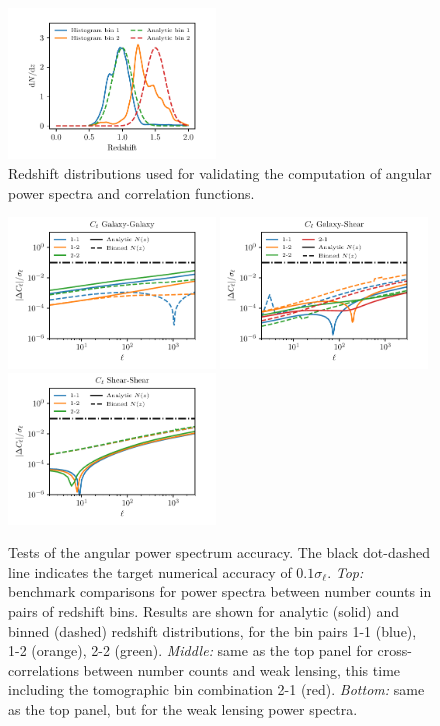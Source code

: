 \documentclass[\docopts]{\docclass}
\begin{document}
\begin{figure}
\centering
\includegraphics[width=0.49\textwidth]{dNdz_codecomp}
\caption{Redshift distributions used for validating the computation of angular power spectra and correlation functions.}
\label{fig:zhistos}
\end{figure}
\begin{figure}
\includegraphics[width=0.49\textwidth]{Cl_dd}
\includegraphics[width=0.49\textwidth]{Cl_dl}
\includegraphics[width=0.49\textwidth]{Cl_ll}
\caption{Tests of the angular power spectrum accuracy. The black dot-dashed line indicates the target numerical accuracy of $0.1\sigma_\ell$. {\sl Top:} benchmark comparisons for power spectra between number counts in pairs of redshift bins. Results are shown for analytic (solid) and binned (dashed) redshift distributions, for the bin pairs 1-1 (blue), 1-2 (orange), 2-2 (green). {\sl Middle:} same as the top panel for cross-correlations between number counts and weak lensing, this time including the tomographic bin combination 2-1 (red). {\sl Bottom:} same as the top panel, but for the weak lensing power spectra.}
\label{fig:cls_limber}
\end{figure}
\end{document}
